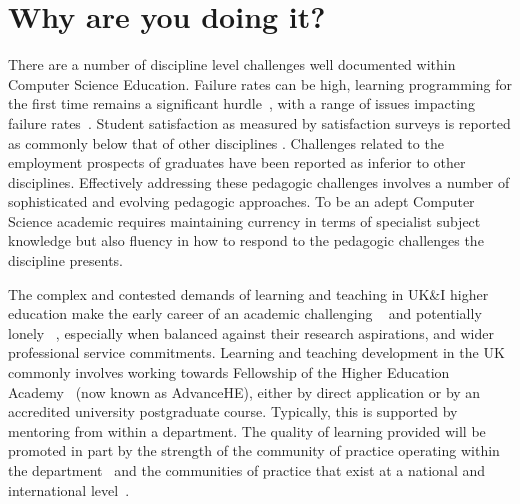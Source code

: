 \documentclass[sigconf]{acmart}
\begin{document}
\section{Why are you doing it?}
There are a number of discipline level challenges well documented within Computer Science Education. Failure rates can be high, learning programming for the first time remains a significant hurdle~\cite{davenport-et-al:latice2016,murphy-et-al:programming2017,simon-et-al:sigcse2018}, with a range of issues impacting failure rates~\cite{Watson:2014:FRI:2591708.2591749}. Student satisfaction as measured by satisfaction surveys is reported as commonly below that of other disciplines \cite{Sinclair2015}. Challenges related to the employment prospects of graduates have been reported as inferior to other disciplines\cite{shadbolt2016shadbolt}. Effectively addressing these pedagogic challenges involves a number of sophisticated and evolving pedagogic approaches. To be an adept Computer Science academic requires maintaining currency in terms of specialist subject knowledge but also fluency in how to respond to the pedagogic challenges the discipline presents.

The complex and contested demands of learning and teaching in UK\&I higher education make the early career of an academic challenging ~\cite{Thomas2015} and potentially lonely ~\cite{Foote2009}, especially when balanced against their research aspirations, and wider professional service commitments. Learning and teaching development in the UK commonly involves working towards Fellowship of the Higher Education Academy~\cite{fellowship} (now known as AdvanceHE), either by direct application or by an accredited university postgraduate course. Typically, this is supported by mentoring from within a department. The quality of learning provided will be promoted in part by the strength of the community of practice operating within the department~\cite{Bolander2008} and the communities of practice that exist at a national and international level~\cite{Thomas2015}.
\end{document}
